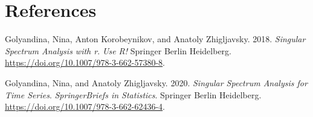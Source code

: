 \documentclass[
  letterpaper,
  DIV=11,
  numbers=noendperiod]{scrartcl}
\newlength{\cslhangindent}
\newenvironment{CSLReferences}[2] %
 {\begin{list}{}{%
  \setlength{\itemindent}{0pt}
  \setlength{\leftmargin}{0pt}
  \setlength{\parsep}{0pt}
  \ifodd #1
   \setlength{\leftmargin}{\cslhangindent}
   \setlength{\itemindent}{-1\cslhangindent}
  \fi
  \setlength{\itemsep}{#2\baselineskip}}}
 {\end{list}}
\begin{document}
\begin{longtable}{lllll}
\end{longtable}

\section*{References}\label{references}

\label{refs}
\begin{CSLReferences}{1}{0}
Golyandina, Nina, Anton Korobeynikov, and Anatoly Zhigljavsky. 2018.
\emph{Singular Spectrum Analysis with r}. \emph{Use R!} Springer Berlin
Heidelberg. \url{https://doi.org/10.1007/978-3-662-57380-8}.

Golyandina, Nina, and Anatoly Zhigljavsky. 2020. \emph{Singular Spectrum
Analysis for Time Series}. \emph{SpringerBriefs in Statistics}. Springer
Berlin Heidelberg. \url{https://doi.org/10.1007/978-3-662-62436-4}.

\end{CSLReferences}
\end{document}
